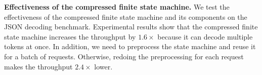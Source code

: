 \textbf{Effectiveness of the compressed finite state machine.}
We test the effectiveness of the compressed finite state machine and its components on the JSON decoding benchmark.
Experimental results show that the compressed finite state machine increases the throughput by $1.6\times$ because it can decode multiple tokens at once. In addition, we need to preprocess the state machine and reuse it for a batch of requests. Otherwise, redoing the preprocessing for each request makes the throughput $2.4\times$ lower.












